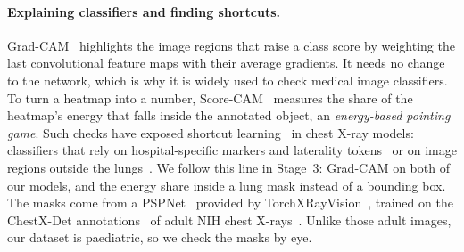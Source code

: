 \paragraph{Explaining classifiers and finding shortcuts.}
Grad-CAM~\cite{selvaraju2017gradcam} highlights the image regions that raise a class score by weighting the last convolutional feature maps with their average gradients.
It needs no change to the network, which is why it is widely used to check medical image classifiers.
To turn a heatmap into a number, Score-CAM~\cite{wang2020scorecam} measures the share of the heatmap's energy that falls inside the annotated object, an \emph{energy-based pointing game}.
Such checks have exposed shortcut learning~\cite{geirhos2020shortcut} in chest X-ray models: classifiers that rely on hospital-specific markers and laterality tokens~\cite{zech2018variable}
or on image regions outside the lungs~\cite{degrave2021ai}.
We follow this line in Stage~3: Grad-CAM on both of our models, and the energy share inside a lung mask instead of a bounding box.
The masks come from a PSPNet~\cite{zhao2017pspnet} provided by TorchXRayVision~\cite{cohen2022torchxrayvision}, trained on the ChestX-Det annotations~\cite{lian2021chestxdet}
of adult NIH chest X-rays~\cite{wang2017chestxray8}. Unlike those adult images, our dataset is paediatric, so we check the masks by eye.

